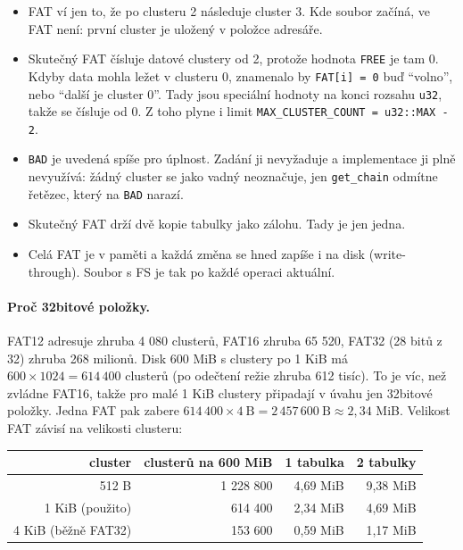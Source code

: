 \documentclass[10pt, a4paper]{report}
\newcommand{\code}[1]{\texttt{#1}}
\begin{document}
	\begin{itemize}
		\item FAT ví jen to, že po clusteru 2 následuje cluster 3. Kde soubor začíná, ve FAT není:
		první cluster je uložený v položce adresáře.
		\item Skutečný FAT čísluje datové clustery od 2, protože hodnota \code{FREE} je tam 0.
		Kdyby data mohla ležet v clusteru 0, znamenalo by \code{FAT[i] = 0} buď \enquote{volno},
		nebo \enquote{další je cluster 0}. Tady jsou speciální hodnoty na konci rozsahu \code{u32},
		takže se čísluje od 0. Z toho plyne i limit
		\code{MAX\_CLUSTER\_COUNT = u32::MAX - 2}.
		\item \code{BAD} je uvedená spíše pro úplnost. Zadání ji nevyžaduje a implementace ji plně
		nevyužívá: žádný cluster se jako vadný neoznačuje, jen \code{get\_chain} odmítne řetězec,
		který na \code{BAD} narazí.
		\item Skutečný FAT drží dvě kopie tabulky jako zálohu. Tady je jen jedna.
		\item Celá FAT je v paměti a každá změna se hned zapíše i na disk (write-through). Soubor
		s FS je tak po každé operaci aktuální.
	\end{itemize}
	
	\paragraph{Proč 32bitové položky.} FAT12 adresuje zhruba 4 080 clusterů, FAT16 zhruba
	65 520, FAT32 (28 bitů z 32) zhruba 268 milionů. Disk 600 MiB s clustery po 1 KiB má
	$600 \times 1024 = 614\,400$ clusterů (po odečtení režie zhruba 612 tisíc). To je víc, než
	zvládne FAT16, takže pro malé 1 KiB clustery připadají v úvahu jen 32bitové položky.
	Jedna FAT pak zabere $614\,400 \times 4\ \text{B} = 2\,457\,600\ \text{B} \approx 2{,}34$ MiB.
	Velikost FAT závisí na velikosti clusteru:
	
	\begin{table}[H]
		\centering
		\begin{tabular}{|r|r|r|r|}
			\hline
			\textbf{cluster} & \textbf{clusterů na 600 MiB} & \textbf{1 tabulka} & \textbf{2 tabulky} \\ \hline
			512 B & 1 228 800 & 4,69 MiB & 9,38 MiB \\ \hline
			1 KiB (použito) & 614 400 & 2,34 MiB & 4,69 MiB \\ \hline
			4 KiB (běžně FAT32) & 153 600 & 0,59 MiB & 1,17 MiB \\ \hline
		\end{tabular}
	\end{table}
	
\end{document}
